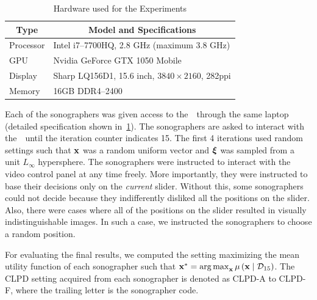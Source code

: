 \begin{table}
  \centering
  \caption{Hardware used for the Experiments}\label{table:specs}
  \begin{threeparttable}
  \begin{tabular}{ll}
    \toprule
    \multicolumn{1}{c}{\textbf{Type}}
    & \multicolumn{1}{c}{\textbf{Model and Specifications}}
    \\ \midrule
    Processor & Intel i7--7700HQ, 2.8 GHz (maximum 3.8 GHz) \\
    GPU       & Nvidia GeForce GTX 1050 Mobile \\
    Display   & Sharp LQ156D1, 15.6 inch, \(3840 \times 2160\), 282ppi  \\
    Memory    & 16GB DDR4--2400 \\ \bottomrule
  \end{tabular}
  \end{threeparttable}
\end{table}
%
Each of the sonographers was given access to the~\usdg~through the same laptop (detailed specification shown in~\cref{table:specs}).
The sonographers are asked to interact with the~\usdg~until the iteration counter indicates 15.
The first 4 iterations used random settings such that \(\mathbf{x}\) was a random uniform vector and \(\bm{\xi}\) was sampled from a unit \(L_{\infty}\) hypersphere.
The sonographers were instructed to interact with the video control panel at any time freely.
More importantly, they were instructed to base their decisions only on the \textit{current} slider.
Without this, some sonographers could not decide because they indifferently disliked all the positions on the slider.
Also, there were cases where all of the positions on the slider resulted in visually indistinguishable images.
In such a case, we instructed the sonographers to choose a random position.

For evaluating the final results, we computed the setting maximizing the mean utility function of each sonographer such that \( \mathbf{x}^* = \operatorname*{arg\,max}_{\mathbf{x}} \mu\left(\mathbf{x} \mid \mathcal{D}_{15} \right) \).
The CLPD setting acquired from each sonographer is denoted as CLPD-A to CLPD-F, where the trailing letter is the sonographer code.

